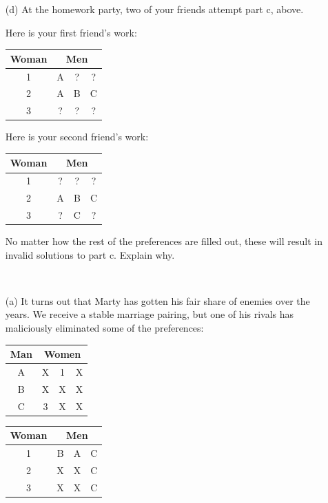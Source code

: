 \documentclass[11pt]{article}
\begin{document}
\begin{qunlist}
\begin{itemize}
\item[(d)] At the homework party, two of your friends attempt part c, above. 

Here is your first friend's work: 

\begin{center}
\begin{tabular}{|c|ccc|}\hline 
Woman&\multicolumn{3}{|c|}{Men}\\\hline 
1&A&?&?\\\hline 
2&A&B&C\\\hline 
3&?&?&?\\\hline
\end{tabular} 
\end{center}

Here is your second friend's work:

\begin{center}
\begin{tabular}{|c|ccc|}\hline 
Woman&\multicolumn{3}{|c|}{Men}\\\hline 
1&?&?&?\\\hline 
2&A&B&C\\\hline 
3&?&C&?\\\hline
\end{tabular}
\end{center}
 
 No matter how the rest of the preferences are filled out, these will result in invalid solutions to part c. Explain why.
\end{itemize} 
    



        
 \\
\begin{itemize}
\item[(a)] It turns out that Marty has gotten his fair share of enemies over the years. We receive a stable marriage pairing, but one of his rivals has maliciously eliminated some of the preferences:

\begin{center}
\begin{tabular}{|c|ccc|}\hline 
Man&\multicolumn{3}{|c|}{Women}\\\hline 
A&X&1&X\\\hline 
B&X&X&X\\\hline 
C&3&X&X\\\hline
\end{tabular} 
\hspace{2cm}
\begin{tabular}{|c|ccc|}\hline 
Woman&\multicolumn{3}{|c|}{Men}\\\hline 
1&B&A&C\\\hline 
2&X&X&C\\\hline 
3&X&X&C\\\hline
\end{tabular}
\end{center}
        

\end{itemize}
\end{qunlist}
\end{document}
